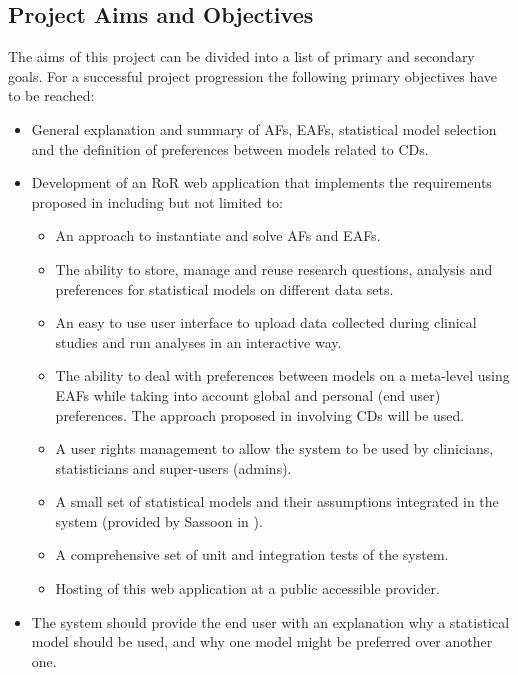 \subsection{Project Aims and Objectives} 
\label{sub:aims}

The aims of this project can be divided into a list of primary and secondary goals. For a successful project progression the following primary objectives have to be reached:
\begin{itemize}
	\item General explanation and summary of \glspl{AF}, \glspl{EAF}, statistical model selection and the definition of preferences between models related to \glspl{CD}.
	\item Development of an \gls{RoR} web application that implements the requirements proposed in \cite{sassoon2014,sassoon2016CD} including but not limited to:
	\begin{itemize}
		\item An approach to instantiate and solve \glspl{AF} and \glspl{EAF}.
		\item The ability to store, manage and reuse research questions, analysis and preferences for statistical models on different data sets.
		\item An easy to use user interface to upload data collected during clinical studies and run analyses in an interactive way.
		\item The ability to deal with preferences between models on a meta-level using \glspl{EAF} while taking into account global and personal (end user) preferences. The approach proposed in \cite{sassoon2016CD} involving \glspl{CD} will be used.
		\item A user rights management to allow the system to be used by clinicians, statisticians and super-users (admins).
		\item A small set of statistical models and their assumptions integrated in the system (provided by Sassoon in \cite{sassoon2016CD}).
		\item A comprehensive set of unit and integration tests of the system.
		\item Hosting of this web application at a public accessible provider.
	\end{itemize}	
	\item The system should provide the end user with an explanation why a statistical model should be used, and why one model might be preferred over another one.
\end{itemize}

